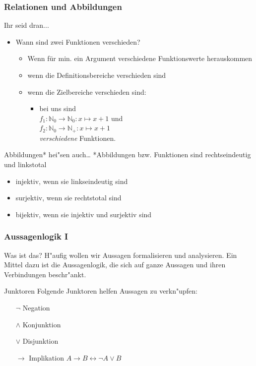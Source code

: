 \begin{frame}
\frametitle{Relationen und Abbildungen}
  \begin{block}{Ihr seid dran...}
  	\begin{itemize}
 			\item Wann sind zwei Funktionen verschieden?
 				\pause
 					\begin{itemize}  \pause
 					 	\item Wenn für min. ein Argument verschiedene Funktionswerte
 					 	herauskommen \pause
   					 	\item wenn die Definitionsbereiche verschieden sind \pause
    					\item wenn die Zielbereiche verschieden sind: \pause
      					\begin{itemize}
      						\item bei uns sind
      							\\ $f_1:\mathbb N_0 \rightarrow \mathbb N_0: x\mapsto x+1$ und
      							\\ $f_2:\mathbb N_0 \rightarrow \mathbb N_+: x\mapsto x+1$
      							\\\emph{verschiedene} Funktionen.
  						\end{itemize}
 					\end{itemize}
  	\end{itemize}
  \end{block}
 \pause
\begin{block}{Abbildungen* hei"sen auch\ldots}
    *Abbildungen bzw. Funktionen sind rechtseindeutig und linkstotal
    \begin{itemize}
      \item injektiv, wenn sie \pause linkseindeutig sind
      \item surjektiv, wenn sie \pause rechtstotal sind
      \item bijektiv, wenn sie \pause injektiv und surjektiv sind
    \end{itemize}
\end{block}
\end{frame}


\begin{frame}
	\frametitle{Aussagenlogik I}
	 \begin{block}{Was ist das?}
	 H"aufig wollen wir Aussagen formalisieren und analysieren. Ein Mittel dazu ist die Aussagenlogik, die sich auf ganze Aussagen und ihren Verbindungen beschr"ankt.
	 \end{block}
	 
	 \begin{block}{Junktoren}
	 Folgende Junktoren helfen Aussagen zu verkn"upfen:
	 \begin{itemize}
	 	\item[$\neg$] Negation 
	 	\item[$\land$] Konjunktion
	 	\item[$\lor$] Disjunktion
	 	\item[$\rightarrow$] Implikation $A \rightarrow B \leftrightarrow \neg A \lor B$
	 \end{itemize}
	 \end{block}
\end{frame}

